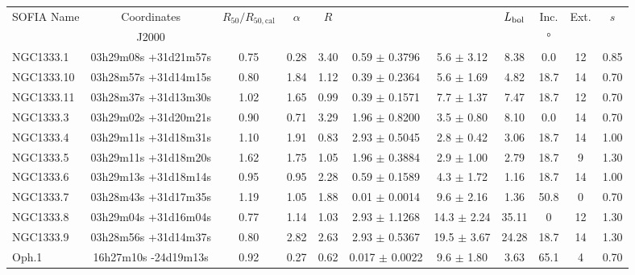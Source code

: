 \begin{table}[!h]
\scriptsize
\caption[Fitted parameters]{Fitted parameters for the three clusters where long-wavelength photometry is available.}
\label{tab:FittedParameters}
\vspace{-0.5cm}
\hspace*{-1.5cm}
\begin{center}
\begin{longtable}{lcccccccccc}

\toprule																									
SOFIA Name	&	Coordinates	&	$R_{50}/R_{50,\textrm{cal}}$	&	$\alpha$	&	$R$	&	\Menv			&	\Ltot			&	$L_\textrm{bol}$	&	Inc.	&	Ext.	&	$s$	\\
	&	J2000	&		&		&		&	\si{\Msun}			&	\si{\Lsun}			&	\si{\Lsun}	&	\si{\degree}	&		&		\\
\midrule																									
NGC1333.1	&	03h29m08s +31d21m57s	&	0.75	&	0.28	&	3.40	&	0.59	$\pm$	0.3796	&	5.6	$\pm$	3.12	&	8.38	&	0.0	&	12	&	0.85	\\
NGC1333.10	&	03h28m57s +31d14m15s	&	0.80	&	1.84	&	1.12	&	0.39	$\pm$	0.2364	&	5.6	$\pm$	1.69	&	4.82	&	18.7	&	14	&	0.70	\\
NGC1333.11	&	03h28m37s +31d13m30s	&	1.02	&	1.65	&	0.99	&	0.39	$\pm$	0.1571	&	7.7	$\pm$	1.37	&	7.47	&	18.7	&	12	&	0.70	\\
NGC1333.3	&	03h29m02s +31d20m21s	&	0.90	&	0.71	&	3.29	&	1.96	$\pm$	0.8200	&	3.5	$\pm$	0.80	&	8.10	&	0.0	&	14	&	0.70	\\
NGC1333.4	&	03h29m11s +31d18m31s	&	1.10	&	1.91	&	0.83	&	2.93	$\pm$	0.5045	&	2.8	$\pm$	0.42	&	3.06	&	18.7	&	14	&	1.00	\\
NGC1333.5	&	03h29m11s +31d18m20s	&	1.62	&	1.75	&	1.05	&	1.96	$\pm$	0.3884	&	2.9	$\pm$	1.00	&	2.79	&	18.7	&	9	&	1.30	\\
NGC1333.6	&	03h29m13s +31d18m14s	&	0.95	&	0.95	&	2.28	&	0.59	$\pm$	0.1589	&	4.3	$\pm$	1.72	&	1.16	&	18.7	&	14	&	1.00	\\
NGC1333.7	&	03h28m43s +31d17m35s	&	1.19	&	1.05	&	1.88	&	0.01	$\pm$	0.0014	&	9.6	$\pm$	2.16	&	1.36	&	50.8	&	0	&	0.70	\\
NGC1333.8	&	03h29m04s +31d16m04s	&	0.77	&	1.14	&	1.03	&	2.93	$\pm$	1.1268	&	14.3	$\pm$	2.24	&	35.11	&0	&	12	&	1.30	\\
NGC1333.9	&	03h28m56s +31d14m37s	&	0.80	&	2.82	&	2.63	&	2.93	$\pm$	0.5367	&	19.5	$\pm$	3.67	&	24.28	&	18.7	&	14	&	1.30	\\
Oph.1	&	16h27m10s -24d19m13s	&	0.92	&	0.27	&	0.62	&	0.017	$\pm$	0.0022	&	9.6	$\pm$	1.80	&	3.63	&	65.1	&	4	&	0.70	\\

\end{longtable}
\end{center}
\end{table}
